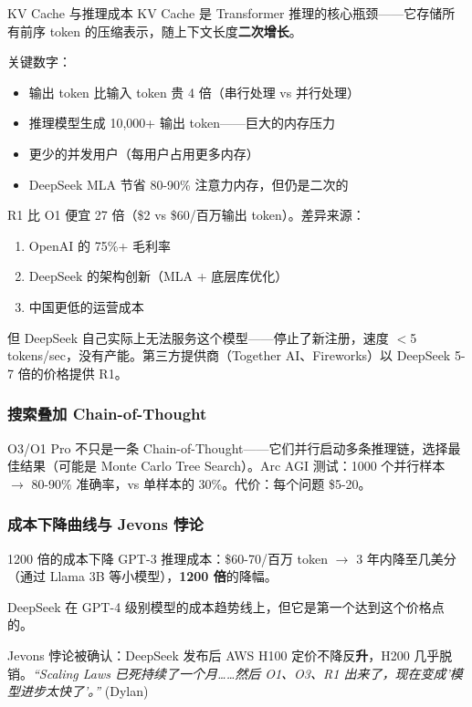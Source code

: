 \documentclass[a4paper]{article}
\begin{document}
\begin{knowledgebox}{KV Cache 与推理成本}
KV Cache 是 Transformer 推理的核心瓶颈——它存储所有前序 token 的压缩表示，随上下文长度\textbf{二次增长}。

关键数字：
\begin{itemize}
    \item 输出 token 比输入 token 贵 4 倍（串行处理 vs 并行处理）
    \item 推理模型生成 10,000+ 输出 token——巨大的内存压力
    \item 更少的并发用户（每用户占用更多内存）
    \item DeepSeek MLA 节省 80-90\% 注意力内存，但仍是二次的
\end{itemize}

R1 比 O1 便宜 27 倍（\$2 vs \$60/百万输出 token）。差异来源：
\begin{enumerate}
    \item OpenAI 的 75\%+ 毛利率
    \item DeepSeek 的架构创新（MLA + 底层库优化）
    \item 中国更低的运营成本
\end{enumerate}

但 DeepSeek 自己实际上无法服务这个模型——停止了新注册，速度 $<$5 tokens/sec，没有产能。第三方提供商（Together AI、Fireworks）以 DeepSeek 5-7 倍的价格提供 R1。
\end{knowledgebox}

\subsubsection{搜索叠加 Chain-of-Thought}

O3/O1 Pro 不只是一条 Chain-of-Thought——它们并行启动多条推理链，选择最佳结果（可能是 Monte Carlo Tree Search）。Arc AGI 测试：1000 个并行样本 $\to$ 80-90\% 准确率，vs 单样本的 30\%。代价：每个问题 \$5-20。

\subsubsection{成本下降曲线与 Jevons 悖论}

\begin{importantbox}{1200 倍的成本下降}
GPT-3 推理成本：\$60-70/百万 token $\to$ 3 年内降至几美分（通过 Llama 3B 等小模型），\textbf{1200 倍}的降幅。

DeepSeek 在 GPT-4 级别模型的成本趋势线上，但它是第一个达到这个价格点的。

Jevons 悖论被确认：DeepSeek 发布后 AWS H100 定价不降反\textbf{升}，H200 几乎脱销。\textit{``Scaling Laws 已死持续了一个月……然后 O1、O3、R1 出来了，现在变成'模型进步太快了'。''} (Dylan)
\end{importantbox}
\end{document}
